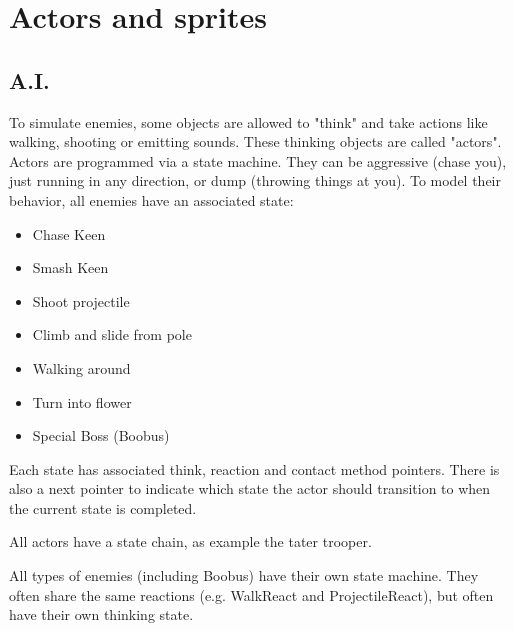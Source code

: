\documentclass[book.tex]{subfiles}
\begin{document}
\section{Actors and sprites}

\subsection{A.I.}
To simulate enemies, some objects are allowed to "think" and take actions like walking,
shooting or emitting sounds. These thinking objects are called "actors".
Actors are programmed via a state machine. They can be aggressive (chase you), just running in any direction, or dump (throwing things at you). To model their behavior, all enemies have an associated state:
\begin{itemize}
  \item Chase Keen
  \item Smash Keen
  \item Shoot projectile
  \item Climb and slide from pole
  \item Walking around
  \item Turn into flower
  \item Special Boss (Boobus)
\end{itemize}
\par

Each state has associated think, reaction and contact method pointers. There is also a next
pointer to indicate which state the actor should transition to when the current state is completed.\\
\par
\begin{minipage}{\textwidth}
  
\end{minipage}
\label{state_type}
\par

All actors have a state chain, as example the tater trooper.\\
\par
\begin{minipage}{\textwidth}

\end{minipage}
\par
All types of enemies (including Boobus) have their own state machine. They often share
the same reactions (e.g. WalkReact and ProjectileReact), but often have their own thinking state.
\end{document}
